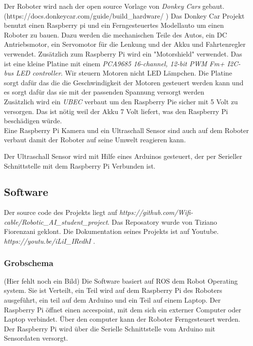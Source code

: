 \documentclass[a4paper,11pt]{article}
\theoremstyle{mytheor}
\begin{document}
Der Roboter wird nach der open source Vorlage von \textit{Donkey Cars} gebaut. (https://docs.donkeycar.com/guide/build\_hardware/ ) Das Donkey Car Projekt benutzt einen Raspberry pi und ein Ferngesteuertes Modellauto um einen Roboter zu bauen. Dazu werden die mechanischen Teile des Autos, ein DC Antriebsmotor, ein Servomotor für die Lenkung und der Akku und Fahrtenregler verwendet. Zusätzlich zum Raspberry Pi wird ein "Motorshield" verwendet. Das ist eine kleine Platine mit einem \textit{PCA9685 16-channel, 12-bit PWM Fm+ I2C-bus LED controller}. Wir steuern Motoren nicht LED Lämpchen. Die Platine sorgt dafür das die die Geschwindigkeit der Motoren gesteuert werden kann und es sorgt dafür das sie  mit der passenden Spannung versorgt werden\\

Zusätzlich wird ein \textit{UBEC} verbaut um den Raspberry Pie sicher mit 5 Volt zu versorgen. Das ist nötig weil der Akku 7 Volt liefert, was den Raspberry Pi beschädigen würde.\\

Eine Raspberry Pi Kamera und ein Ultraschall Sensor sind auch auf dem Roboter verbaut damit der Roboter auf seine Umwelt reagieren kann.

Der Ultraschall Sensor wird mit Hilfe eines Arduinos gesteuert, der per Serieller Schnittstelle mit dem Raspberry Pi Verbunden ist. 

\subsection{Software}

Der source code des Projekts liegt auf \textit{https://github.com/Wifi-cable/Robotic\_AI\_student\_project}. Das Reposatory wurde von  Tiziano Fiorenzani geklont. Die Dokumentation seines Projekts ist auf Youtube. \textit{https://youtu.be/iLiI\_IRedhI} .

\subsubsection{Grobschema}
(Hier fehlt noch ein Bild)
Die Software basiert auf ROS dem Robot Operating system. Sie ist Verteilt, ein Teil wird auf dem Raspberry Pi des Roboters ausgeführt, ein teil auf dem Arduino und ein Teil auf einem Laptop.  Der Raspberry Pi öffnet einen accespoint, mit dem sich ein externer Computer oder Laptop verbindet. Über den computer kann der Roboter Ferngesteuert werden. Der Raspberry Pi wird über die Serielle Schnittstelle vom Arduino mit Sensordaten versorgt. 
\end{document}
